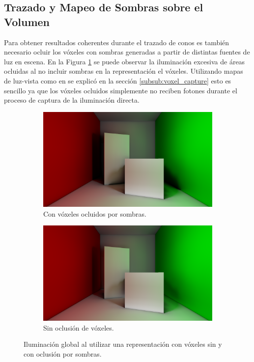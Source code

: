 \subsection{Trazado y Mapeo de Sombras sobre el Volumen} %
\label{sub:trazado_de_sombras_sobre_el_volumen}

Para obtener resultados coherentes durante el trazado de conos es también necesario ocluir los vóxeles con sombras generadas a partir de distintas fuentes de luz en escena. En la Figura \ref{fig:voxel_shadow_error} se puede observar la iluminación excesiva de áreas ocluidas al no incluir sombras en la representación el vóxeles. Utilizando mapas de luz-vista como en se explicó en la sección \ref{subsub:voxel_capture} esto es sencillo ya que los vóxeles ocluidos simplemente no reciben fotones durante el proceso de captura de la iluminación directa.

\begin{figure}[H]
	\centering
	\begin{subfigure}[t]{0.49\textwidth}
		\centering
		\captionsetup{justification=centering}
		\includegraphics[width=\linewidth]{media/voxel_shadowing.png}
		\caption*{Con vóxeles ocluidos por sombras.}
	\end{subfigure}%
	\hspace{0.01\textwidth}
	\begin{subfigure}[t]{0.49\textwidth}
		\centering
		\captionsetup{justification=centering}
		\includegraphics[width=\linewidth]{media/voxel_noshadowing.png}
		\caption*{Sin oclusión de vóxeles.}
	\end{subfigure}%
	\caption{Iluminación global al utilizar una representación con vóxeles sin y con oclusión por sombras.}
	\label{fig:voxel_shadow_error}
\end{figure}

